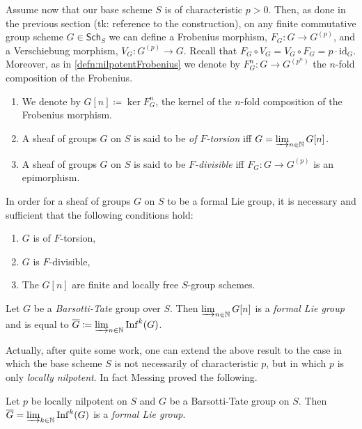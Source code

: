 \documentclass[../Main]{subfiles}
\begin{document}
Assume now that our base scheme $S$ is of characteristic $p  > 0$.
Then, as done in the previous section (tk: reference to the construction),
on any finite commutative group scheme 
$G \in \mathsf{Sch}_{ S }$ we can define a Frobenius morphism,
$F_G\colon G \to G^{(p)}$, and a Verschiebung morphism, $V_G \colon G^{(p)} \to G$.
Recall that $F_G \circ V_G = V_G \circ F_G = p \cdot \mathrm{id}_{ G }$.
Moreover, as in \cref{defn:nilpotentFrobenius} we denote by 
$F^n_G\colon G \to G^{(p^n)}$ the $n$-fold composition
of the Frobenius.

\begin{defn}[]\leavevmode\vspace{-.2\baselineskip}
\begin{enumerate}
\item We denote by $G[n] \coloneqq \ker F^n_G$, the kernel of the $n$-fold composition
	of the Frobenius morphism.
	
\item A sheaf of groups $G$ on $S$ is said to be {\em of $F$-torsion} iff
	$G = \varinjlim_{n \in \mathbb{N}} G[n]$.

\item A sheaf of groups $G$ on $S$ is said to be {\em $F$-divisible} iff
	$F_G\colon G \to G^{(p)}$ is an epimorphism.
\end{enumerate}
\end{defn}


\begin{thm}
	In order for a sheaf of groups $G$ on $S$ to be a formal Lie group, 
	it is necessary and sufficient that the following conditions hold:
\begin{enumerate}
	\item $G$ is of $F$-torsion,
	\item $G$ is $F$-divisible,
	\item The $G[n]$ are finite and locally free $S$-group schemes.
\end{enumerate}
\end{thm}


\begin{thm}
	Let $G$ be a {\em Barsotti-Tate} group over $S$.
	Then $\varinjlim_{n \in \mathbb{N}} G[n]$ is a {\em formal Lie group}
	and is equal to $\overline{G} \coloneqq \varinjlim_{n \in \mathbb{N}} \mathrm{Inf}^k(G)$.
\end{thm}


Actually, after quite some work, one can extend the above result to the case
in which the base scheme $S$ is not necessarily of characteristic $p$,
but in which $p$ is only {\em locally nilpotent}.
In fact Messing proved the following.
\begin{thm}
	Let $p$ be locally nilpotent on $S$ and $G$ be a Barsotti-Tate group
	on $S$.
	Then $\overline{G} = \varinjlim_{k \in \mathbb{N}}\mathrm{Inf}^k(G)$
	is a {\em formal Lie group}.
\end{thm}
\end{document}
